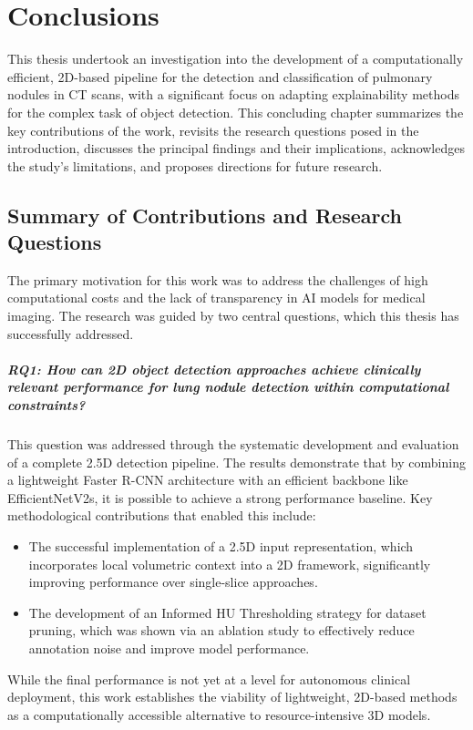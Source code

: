 \chapter{Conclusions}

This thesis undertook an investigation into the development of a computationally efficient, 2D-based pipeline for the detection and classification of pulmonary nodules in CT scans, with a significant focus on adapting explainability methods for the complex task of object detection. This concluding chapter summarizes the key contributions of the work, revisits the research questions posed in the introduction, discusses the principal findings and their implications, acknowledges the study's limitations, and proposes directions for future research.

\section{Summary of Contributions and Research Questions}
\label{sec:summary_contributions}

The primary motivation for this work was to address the challenges of high computational costs and the lack of transparency in AI models for medical imaging. The research was guided by two central questions, which this thesis has successfully addressed.

\paragraph{RQ1: How can 2D object detection approaches achieve clinically relevant performance for lung nodule detection within computational constraints?}
This question was addressed through the systematic development and evaluation of a complete 2.5D detection pipeline. The results demonstrate that by combining a lightweight Faster R-CNN architecture with an efficient backbone like EfficientNetV2s, it is possible to achieve a strong performance baseline. Key methodological contributions that enabled this include:
\begin{itemize}
    \item The successful implementation of a 2.5D input representation, which incorporates local volumetric context into a 2D framework, significantly improving performance over single-slice approaches.
    \item The development of an Informed HU Thresholding strategy for dataset pruning, which was shown via an ablation study to effectively reduce annotation noise and improve model performance.
\end{itemize}
While the final performance is not yet at a level for autonomous clinical deployment, this work establishes the viability of lightweight, 2D-based methods as a computationally accessible alternative to resource-intensive 3D models.

